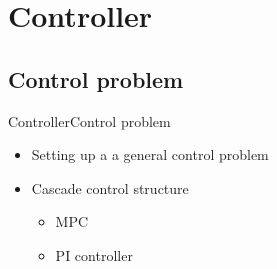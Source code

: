\section{Controller}



\subsection{Control problem}

\begin{frame}{Controller}{Control problem}
\begin{itemize}
	\item<1-> Setting up a a general control problem 
	\item<1-> Cascade control structure
	\begin{itemize}
		\item<1-> MPC
		\item<1-> PI controller
	\end{itemize}
\end{itemize}


%  

\end{frame}


